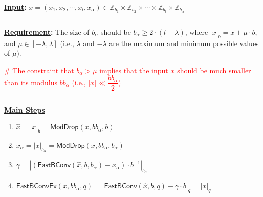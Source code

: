 \begin{tcolorbox}[title={\textbf{\tboxlabel{\ref*{subsec:rns-fastbconvex}} Fast Exact Base Conversion: \textsf{FastBConvEx}}}]

\textbf{\underline{Input}:} $x = (x_1, x_2, \cdots, x_l, x_\alpha) \in \mathbb{Z}_{b_1} \times \mathbb{Z}_{b_2} \times \cdots \times \mathbb{Z}_{b_l} \times \mathbb{Z}_{b_\alpha}$ 

$ $

\textbf{\underline{Requirement}: } The size of $b_\alpha$ should be $b_{\alpha} \geq 2\cdot(l + \lambda)$, where $|x|_{b} = x + \mu \cdot b$, and $\mu \in [-\lambda, \lambda]$ (i.e., $\lambda$ and $-\lambda$ are the maximum and minimum possible values of $\mu$). 

\textcolor{red}{ \# The constraint that $b_\alpha > \mu$ implies that the input $x$ should be much smaller than its modulus $bb_\alpha$ (i.e., $|x| \ll \dfrac{bb_\alpha}{2}$)} %

$ $


\textbf{\underline{Main Steps}}

\begin{enumerate}
\item $\hat{x} = |x|_b = \textsf{ModDrop}(x, bb_\alpha, b)$ 

\item $x_\alpha = |x|_{b_\alpha} = \textsf{ModDrop}(x, bb_\alpha, b_\alpha)$
\item $\gamma = |(\textsf{FastBConv}(\hat{x}, b, b_\alpha) - x_\alpha)\cdot b^{-1}|_{b_\alpha}$

\item $\textsf{FastBConvEx}(x, bb_\alpha, q) = \Big|\textsf{FastBConv}(\hat{x}, b, q) - \gamma \cdot b\Big|_q = |x|_q$

\end{enumerate}

\end{tcolorbox}
                                        
